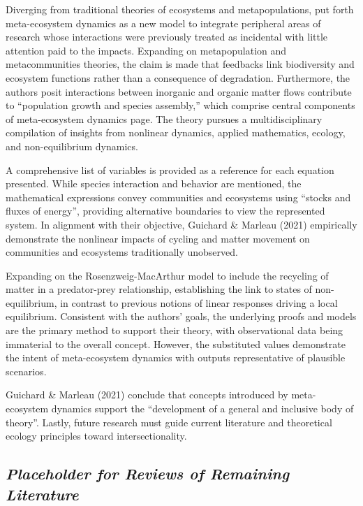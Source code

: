 \documentclass[sn-nature]{sn-jnl}%
\theoremstyle{thmstyleone}%
\theoremstyle{thmstyletwo}%
\theoremstyle{thmstylethree}%
\begin{document}
Diverging from traditional theories of ecosystems and metapopulations, \citet{guichard_meta-ecosystem_2021} put forth meta-ecosystem dynamics as a new model to integrate peripheral areas of research whose interactions were previously treated as incidental with little attention paid to the impacts\cite{guichard_meta-ecosystem_2021}. Expanding on metapopulation and metacommunities theories, the claim is made that feedbacks link biodiversity and ecosystem functions rather than a consequence of degradation. Furthermore, the authors posit interactions between inorganic and organic matter flows contribute to “population growth and species assembly,”\citep[p. v]{guichard_meta-ecosystem_2021} which comprise central components of meta-ecosystem dynamics page.
The theory pursues a multidisciplinary compilation of insights from nonlinear dynamics, applied mathematics, ecology, and non-equilibrium dynamics.

A comprehensive list of variables is provided as a reference for each equation presented. While species interaction and behavior are mentioned, the mathematical expressions convey communities and ecosystems using “stocks and fluxes of energy”\citep[p. 3]{guichard_meta-ecosystem_2021}, providing alternative boundaries to view the represented system. In alignment with their objective, Guichard \& Marleau (2021) empirically demonstrate the nonlinear impacts of cycling and matter movement on communities and ecosystems traditionally unobserved.

Expanding on the Rosenzweig-MacArthur model to include the recycling of matter in a predator-prey relationship, establishing the link to states of non-equilibrium, in contrast to previous notions of linear responses driving a local equilibrium\cite{guichard_meta-ecosystem_2021}. Consistent with the authors’ goals, the underlying proofs and models are the primary method to support their theory, with observational data being immaterial to the overall concept. However, the substituted values demonstrate the intent of meta-ecosystem dynamics with outputs representative of plausible scenarios\cite{guichard_meta-ecosystem_2021}.

Guichard \& Marleau (2021) conclude that concepts introduced by meta-ecosystem dynamics support the “development of a general and inclusive body of theory”\citep[p. 86]{guichard_meta-ecosystem_2021}. Lastly, future research must guide current literature and theoretical ecology principles toward intersectionality.


\subsection*{\textit{Placeholder for Reviews of Remaining Literature}}
\end{document}
